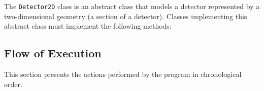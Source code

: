 \documentclass[11pt]{article}
\begin{document}
	The \texttt{Detector2D} class is an abstract class that models a detector
	represented by a two-dimensional geometry (a section of a detector). Classes
	implementing this abstract class must implement the following methods:


	\subsection{Flow of Execution}

		This section presents the actions performed by the program in chronological
		order.



\end{document}
